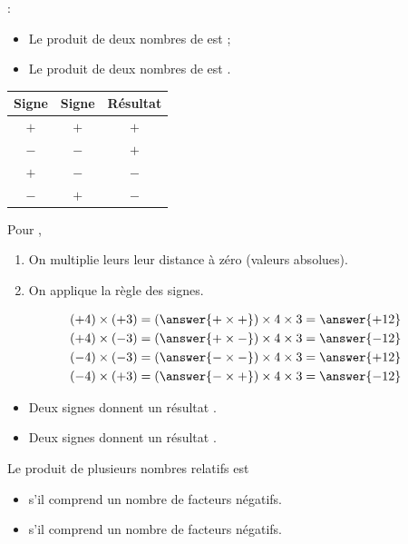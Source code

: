 
\begin{propbox}
 :
    \begin{itemize}
        \item Le produit de deux nombres de  est  ;
        \item Le produit de deux nombres de  est
            .
    \end{itemize}
    \begin{center}
        \begin{tabular}{c|c|c}
        Signe & Signe & Résultat \\ \hline
        $+$ & $+$ & $+$ \\
        $-$ & $-$ & $+$ \\
        $+$ & $-$ & $-$ \\
        $-$ & $+$ & $-$
        \end{tabular}
    \end{center}
\end{propbox}

\begin{propbox}
    Pour , 
    \begin{enumerate}
        \item On multiplie leurs leur distance à zéro (valeurs absolues).
        \item On applique la règle des signes. 
    \end{enumerate}
\end{propbox}


\begin{exemplebox}
    \begin{align*}
        (+4)\times(+3)&= (\answer{+\times+})\times4\times3 = \answer{+12} \\ 
        (+4)\times(-3)&= (\answer{+\times-})\times4\times3 = \answer{-12} \\
        (-4)\times(-3)&= (\answer{-\times-})\times4\times3 = \answer{+12} \\
        (-4)\times(+3)&= (\answer{-\times+})\times4\times3 = \answer{-12} 
    \end{align*}
\end{exemplebox}


\begin{attentionbox}
\begin{itemize}
    \item Deux signes  donnent un résultat .
    \item Deux signes  donnent un résultat .
\end{itemize}
\end{attentionbox}

\begin{propbox}
    Le produit de plusieurs nombres relatifs est 
    \begin{itemize}
        \item {} s'il comprend un nombre  de facteurs
            négatifs.
        \item {} s'il comprend un nombre  de facteurs négatifs.
    \end{itemize}
\end{propbox}
